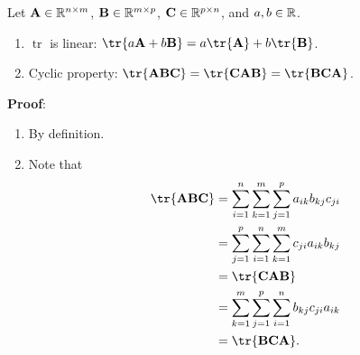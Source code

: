 \begin{Theorem}{}{}
    Let $ \mathbf{A}\in\mathbb{R}^{n\times m} $, $ \mathbf{B}\in\mathbb{R}^{m\times p} $, $ \mathbf{C}\in\mathbb{R}^{p\times n} $,
    and $ a,b\in\mathbb{R} $.
    \begin{enumerate}[(1)]
        \item $ \operatorname{tr} $ is linear: $ \tr{a \Matrix{A}+b \Matrix{B}}=a\tr{\Matrix{A}}+b\tr{\Matrix{B}} $.
        \item Cyclic property: $ \tr{\Matrix{ABC}}=\tr{\Matrix{CAB}}=\tr{\Matrix{BCA}} $.
    \end{enumerate}
    \tcblower{}
    \textbf{Proof}:
    \begin{enumerate}[(1)]
        \item By definition.
        \item Note that
              \begin{align*}
                  \tr{\Matrix{ABC}}
                   & =\sum_{i=1}^{n}\sum_{k=1}^{m}\sum_{j=1}^{p}a_{ik}b_{kj}c_{ji} \\
                   & =\sum_{j=1}^{p}\sum_{i=1}^{n}\sum_{k=1}^{m}c_{ji}a_{ik}b_{kj} \\
                   & =\tr{\Matrix{CAB}}                                            \\
                   & =\sum_{k=1}^{m}\sum_{j=1}^{p}\sum_{i=1}^{n}b_{kj}c_{ji}a_{ik} \\
                   & =\tr{\Matrix{BCA}}.
              \end{align*}
    \end{enumerate}
\end{Theorem}
